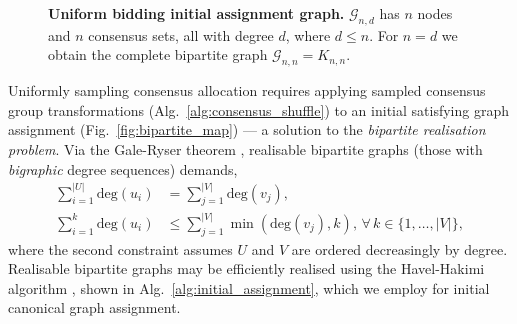 \begin{figure}[!htb]
	\centering
	
	\hfill
	
	\hfill
	
	\caption{\textbf{Uniform bidding initial assignment graph.} \mbox{$\mathcal{G}_{n,d}$} has $n$ nodes and $n$ consensus sets, all with degree $d$, where \mbox{$d\leq n$}. For \mbox{$n=d$} we obtain the complete bipartite graph \mbox{$\mathcal{G}_{n,n}=K_{n,n}$.}}\label{fig:butterfly_graph_comp}
\end{figure}

Uniformly sampling consensus allocation requires applying sampled consensus group transformations (Alg.~\ref{alg:consensus_shuffle}) to an initial satisfying graph assignment (Fig.~\ref{fig:bipartite_map}) --- a solution to the \emph{bipartite realisation problem}. Via the Gale-Ryser theorem \cite{Gale1957, Ryser1957}, realisable bipartite graphs (those with \emph{bigraphic} degree sequences) demands,
\begin{align} \label{eq:bipartite_real}
	\sum_{i=1}^{|U|} \mathrm{deg}(u_i) & = \sum_{j=1}^{|V|} \mathrm{deg}(v_j),                                                     \\
	\sum_{i=1}^k \mathrm{deg}(u_i)     & \leq \sum_{j=1}^{|V|} \min(\mathrm{deg}(v_j),k),\,\forall\, k\in\{1,\dots,|V|\},\nonumber
\end{align}
where the second constraint assumes $U$ and $V$ are ordered decreasingly by degree. Realisable bipartite graphs may be efficiently realised using the Havel-Hakimi algorithm \cite{Havel1955, Hakimi62}, shown in Alg.~\ref{alg:initial_assignment}, which we employ for initial canonical graph assignment.


